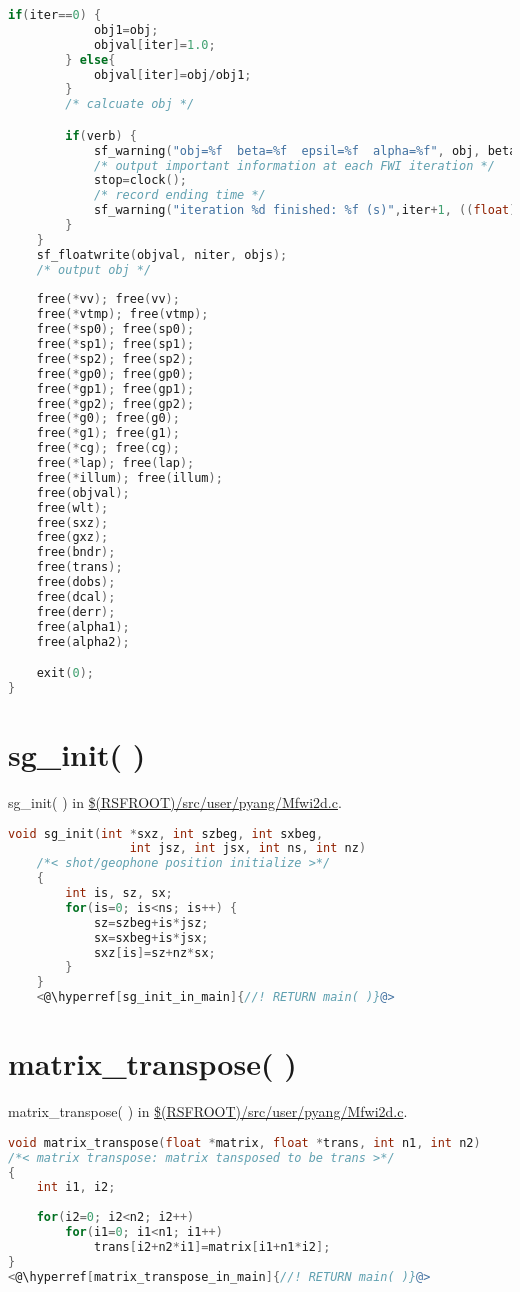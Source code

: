 \documentclass[a4paper,11pt]{article}
\theoremstyle{mytheor}
\begin{document}
\begin{lstlisting}[label={main},language=C,tabsize=4,caption=main()]
		if(iter==0) {
			obj1=obj; 
			objval[iter]=1.0;
		} else{
			objval[iter]=obj/obj1;
		}
		/* calcuate obj */

		if(verb) {
			sf_warning("obj=%f  beta=%f  epsil=%f  alpha=%f", obj, beta, epsil, alpha);
			/* output important information at each FWI iteration */
			stop=clock();
			/* record ending time */ 
			sf_warning("iteration %d finished: %f (s)",iter+1, ((float)(stop-start))/CLOCKS_PER_SEC);
		}
	}
	sf_floatwrite(objval, niter, objs);
	/* output obj */
	
	free(*vv); free(vv);
	free(*vtmp); free(vtmp);
	free(*sp0); free(sp0);
	free(*sp1); free(sp1);
	free(*sp2); free(sp2);
	free(*gp0); free(gp0);
	free(*gp1); free(gp1);
	free(*gp2); free(gp2);
	free(*g0); free(g0);
	free(*g1); free(g1);
	free(*cg); free(cg);
	free(*lap); free(lap);
	free(*illum); free(illum);
	free(objval);
	free(wlt);
	free(sxz);
	free(gxz);
	free(bndr);
	free(trans);
	free(dobs);
	free(dcal);
	free(derr);
	free(alpha1);
	free(alpha2);

	exit(0);
}

\end{lstlisting}

\section*{sg\_init( )}
sg\_init( ) in \url{$(RSFROOT)/src/user/pyang/Mfwi2d.c}.
\begin{lstlisting}[label={sg_init},language=C,tabsize=4,caption=sg\_init( )]
	void sg_init(int *sxz, int szbeg, int sxbeg, 
	             int jsz, int jsx, int ns, int nz)
	/*< shot/geophone position initialize >*/
	{
		int is, sz, sx;
		for(is=0; is<ns; is++) {
			sz=szbeg+is*jsz;
			sx=sxbeg+is*jsx;
			sxz[is]=sz+nz*sx;
		}
	}
	<@\hyperref[sg_init_in_main]{//! RETURN main( )}@>
\end{lstlisting}

\section*{matrix\_transpose( )}
matrix\_transpose( ) in \url{$(RSFROOT)/src/user/pyang/Mfwi2d.c}.
\begin{lstlisting}[label={matrix_transpose},language=C,tabsize=4,caption=matrix\_transpose( )]
void matrix_transpose(float *matrix, float *trans, int n1, int n2)
/*< matrix transpose: matrix tansposed to be trans >*/
{
	int i1, i2;
	
	for(i2=0; i2<n2; i2++)
		for(i1=0; i1<n1; i1++)
			trans[i2+n2*i1]=matrix[i1+n1*i2];
}
<@\hyperref[matrix_transpose_in_main]{//! RETURN main( )}@>
\end{lstlisting}
\end{document}
